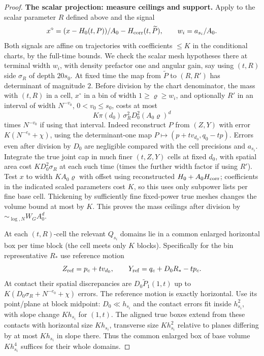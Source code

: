 \begin{proof}
\par\smallskip\noindent\textbf{The scalar projection: measure ceilings and support.}\quad
Apply  to the scalar parameter
\(R\) defined above and the signal
\[
 x^\circ=(x-H_0(t,P))/A_0-H_{\rm corr}(t,\widetilde P),\qquad
 w_i=a_{s_i}/A_0.
\]
Both signals are affine on trajectories with coefficients \(\le K\) in the conditional charts, by the full-time bounds. We check the scalar mesh hypotheses there at terminal width \(w_i\), with density prefactor one and angular gain, say using \((t,R)\) side \(\sigma_R\) of depth \(20s_0\). At fixed time the map from \(\widetilde P\) to \((R,R')\) has determinant of magnitude \(2\). Before division by the chart denominator, the mass with \((t,R)\) in a cell, \(x^\circ\) in a bin of width \(1\ge\varrho\ge w_i\), and optionally \(R'\) in an interval of width \(N^{-v_0}\), \(0<v_0\le s_0\), costs at most
\[
 K\pi(d_0)\,\sigma_R^2 D_0^2 (A_0\varrho)^d
\]
times \(N^{-v_0}\) if using that interval. Indeed reconstruct \(P\) from \((Z,Y)\) with error \(K(N^{-e_0}+\chi)\), using the determinant-one map \(P\mapsto (p+t v_{d_0},q_0-tp)\). Errors even after division by \(D_0\) are negligible compared with the cell precisions and \(a_{s_i}\). Integrate the true joint cap in much finer \((t,Z,Y)\) cells at fixed \(d_0\), with spatial area cost \(K D_0^2\sigma_R\) at each such time (times the further width factor if using \(R'\)). Test \(x\) to width \(K A_0\varrho\) with offset using reconstructed \(H_0+A_0 H_{\rm corr}\); coefficients in the indicated scaled parameters cost \(K\), so this uses only subpower lists per fine base cell. Thickening by sufficiently fine fixed-power true meshes changes the volume bound at most by \(K\). This proves the mass ceilings after division by \(\sim_{\log,N} W_G A_0^d\).

At each \((t,R)\)-cell the relevant \(Q_{s_i}\) domains lie in a common enlarged horizontal box per time block (the cell meets only \(K\) blocks). Specifically for the bin representative \(R_*\) use reference motion
\[
 Z_{\rm ref}=p_c+t v_{d_0},\qquad Y_{\rm ref}=q_c+D_0 R_*-t p_c .
\]
At contact their spatial discrepancies are \(D_0\widetilde P_1(1,t)\) up to \(K(D_0\sigma_R+N^{-e_0}+\chi)\) errors. The reference motion is exactly horizontal. Use its point/plane at block midpoint: \(D_0\ll h_{s_i}\) and the contact errors fit inside \(h_{s_i}^2\), with slope change \(K h_{s_i}\) for \((1,t)\). The aligned true boxes extend from these contacts with horizontal size \(K h_{s_i}\), transverse size \(K h_{s_i}^2\) relative to planes differing by at most \(K h_{s_i}\) in slope there. Thus the common enlarged box of base volume \(K h_{s_i}^4\) suffices for their whole domains.


\end{proof}

